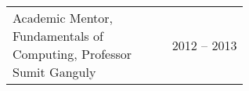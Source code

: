 \documentclass[a4paper]{article} %
\newcommand{\verticalspacing}{-0.25cm}
\newcommand{\headspace}{-0.3cm}
\newcommand{\bulletspace}{0.7cm}
\newcommand{\projectheadspacing}{6.9cm}
\newcommand{\gitproject}[3]{%
    \begin{tabular}{p{0.60\linewidth}r}
        \textcolor{NavyBlue}{\small #2} & \multicolumn{1}{m{ \projectheadspacing{} }}{\raggedleft #1}\\
    \end{tabular}\\
    \begin{tabular}{p{0.98\linewidth}}
        \vspace{\headspace{}}
        \small{#3}
    \end{tabular}
    \vspace{\verticalspacing{}}
    \vspace{-0.2cm} %
}
\newcommand{\skill}[2]{%
    \begin{tabular}{p{0.60\linewidth}r}
        \small {#2} & \multicolumn{1}{m{ \projectheadspacing{} }}{\raggedleft \textsc{\small #1}}\\
    \end{tabular}
    \vspace{\verticalspacing{}}
}
\begin{document}
\skill
    {2012 -- 2013}
    {Academic Mentor, Fundamentals of Computing, Professor Sumit Ganguly}


%
%
%
\end{document}
